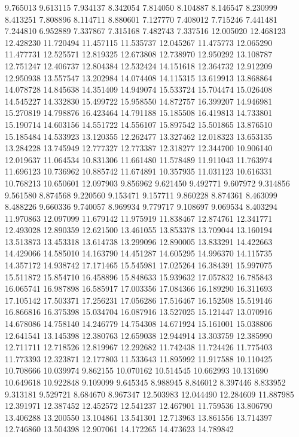 9.765013
9.613115
7.934137
8.342054
7.814050
8.104887
8.146547
8.230999
8.413251
7.808896
8.114711
8.880601
7.127770
7.408012
7.715246
7.441481
7.244810
6.952889
7.337867
7.315168
7.482743
7.337516
12.005020
12.468123
12.428230
11.720494
11.457115
11.535737
12.045267
11.475773
12.065290
11.477731
12.525571
12.819325
12.673808
12.738970
12.950292
13.108787
12.751247
12.406737
12.804384
12.532424
14.151618
12.364732
12.912209
12.950938
13.557547
13.202984
14.074408
14.115315
13.619913
13.868864
14.078728
14.845638
14.351409
14.949074
15.533724
15.704474
15.026408
14.545227
14.332830
15.499722
15.958550
14.872757
16.399207
14.946981
15.270819
14.798876
16.423464
14.791188
15.185508
16.419813
14.733801
15.190714
14.603156
14.551722
14.556107
15.897542
15.501865
13.876510
15.185484
14.533923
13.120355
12.262477
13.327462
12.018323
13.653135
13.284228
13.745949
12.777327
12.773387
12.318277
12.344700
10.906140
12.019637
11.064534
10.831306
11.661480
11.578489
11.911043
11.763974
11.696123
10.736962
10.885742
11.674891
10.357935
11.031123
10.616331
10.768213
10.650601
12.097903
9.856962
9.621450
9.492771
9.607972
9.314856
9.561580
8.874568
9.220560
9.153471
9.157711
9.860228
8.874361
8.463099
8.488226
9.660336
9.740057
8.969934
9.779717
9.108697
9.069534
8.403294
11.970863
12.097099
11.679142
11.975919
11.838467
12.874761
12.341771
12.493028
12.890359
12.621500
13.461055
13.853378
13.709044
13.160194
13.513873
13.453318
13.614738
13.299096
12.890005
13.833291
14.422663
14.429066
14.585010
14.163790
14.451287
14.605295
14.996370
14.115735
14.357172
14.938742
17.171465
15.545981
17.025264
16.384391
15.997075
15.511872
15.854710
16.458896
15.848633
15.939632
17.057832
16.785843
16.065741
16.987898
16.585917
17.003356
17.084366
16.189290
16.311693
17.105142
17.503371
17.256231
17.056286
17.516467
16.152508
15.519146
16.866816
16.375398
15.034704
16.087916
13.527025
15.121447
13.070916
14.678086
14.758140
14.246779
14.754308
14.671924
15.161001
15.038806
12.641541
13.145398
12.380763
12.659038
12.944914
13.303759
12.385990
12.711711
12.718526
12.819967
12.292682
11.742438
11.724426
11.775403
11.773393
12.323871
12.177803
11.533643
11.895992
11.917588
10.110425
10.708666
10.039974
9.862155
10.070162
10.514545
10.662993
10.131690
10.649618
10.922848
9.109099
9.645345
8.988945
8.846012
8.397446
8.833952
9.313181
9.529721
8.684670
8.967347
12.503983
12.044490
12.284609
11.887985
12.391971
12.387452
12.452572
12.541237
12.467901
11.759536
13.806790
13.406288
13.200550
13.104861
13.541301
12.713963
13.861556
13.714397
12.746860
13.504398
12.907061
14.172265
14.473623
14.789842
